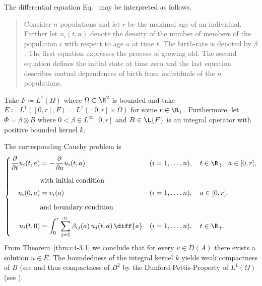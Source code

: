 The differential equation Eq.~ may be interpreted as follows.
\begin{quote}
Consider $n$ populations and let $r$ be the maximal age of an individual.
Further let $u_{i}(t,a)$ denote the density of the number of members of the population $i$ with respect to age $a$ at time $t$.
The birth-rate is denoted by $\beta$.
The first equation expresses the process of growing old.
The second equation defines the initial state at time zero and the last equation describes mutual dependences of birth from individuals of the $n$ populations.
\end{quote}
\begin{example}\label{ex:c4-3.13}
%
Take $F \coloneqq L^{1}(\Omega)$ where $\Omega \subset \R^{2}$ is bounded and take \\ $E \coloneqq L^{1}([0,r], F) = L^{1}([0,r] \times \Omega)$ for some $r \in \R_{+}$.
Furthermore, let $\Phi = \beta \otimes B$ where $0 < \beta \in L^{\infty}[0,r]$ and $B \in \L{F}$ is an integral operator with positive bounded kernel $k$.

The corresponding Cauchy problem is
\begin{equation} \label{eq:c4-3.14}
\left\{
\begin{aligned}
\frac{\partial}{\partial t}u_i(t,a) &= -\frac{\partial}{\partial a}u_i(t,a) 
    && (i=1,\ldots,n), \quad t\in\R_+,\ a\in[0,r], \\[2mm]
&\text{with initial condition} \\[1mm]
u_i(0,a) &= v_i(a) 
    && (i=1,\ldots,n), \quad a\in[0,r], \\[2mm]
&\text{and boundary condition} \\[1mm]
u_i(t,0) &= \int_0^r \sum_{j=1}^n \beta_{ij}(a)\,u_j(t,a)\,\diff{a} 
    && (i=1,\ldots,n), \quad t\in\R_+.
\end{aligned}
\right.
\end{equation}
From Theorem~\ref{thm:c4-3.1} we conclude that for every $v \in D(A)$ there exists a solution $u \in E$.
The boundedness of the integral kernel $k$ yields weak compactness of\/ $B$ (see \textcite[Section II.5]{schaefer:1974} and thus compactness of\/ $B^{2}$ by the Dunford-Pettis-Property of\/ $L^{1}(\Omega)$ (see \textcite[Chapter II, Theorem.9.9]{schaefer:1974}).


\end{example}
